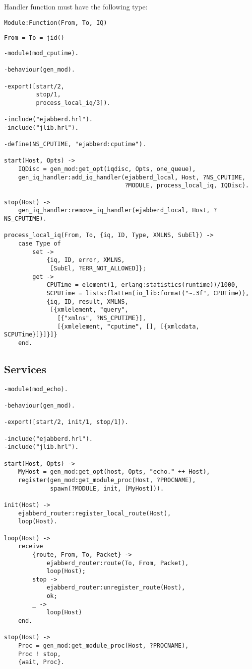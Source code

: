 \documentclass[a4paper,10pt]{article}
\begin{document}
Handler function must have the following type:
\begin{description}
\item{\verb|Module:Function(From, To, IQ)|}
\begin{verbatim}
From = To = jid()
\end{verbatim}
\end{description}



\begin{verbatim}
-module(mod_cputime).

-behaviour(gen_mod).

-export([start/2,
         stop/1,
         process_local_iq/3]).

-include("ejabberd.hrl").
-include("jlib.hrl").

-define(NS_CPUTIME, "ejabberd:cputime").

start(Host, Opts) ->
    IQDisc = gen_mod:get_opt(iqdisc, Opts, one_queue),
    gen_iq_handler:add_iq_handler(ejabberd_local, Host, ?NS_CPUTIME,
                                  ?MODULE, process_local_iq, IQDisc).

stop(Host) ->
    gen_iq_handler:remove_iq_handler(ejabberd_local, Host, ?NS_CPUTIME).

process_local_iq(From, To, {iq, ID, Type, XMLNS, SubEl}) ->
    case Type of
        set ->
            {iq, ID, error, XMLNS,
             [SubEl, ?ERR_NOT_ALLOWED]};
        get ->
            CPUTime = element(1, erlang:statistics(runtime))/1000,
            SCPUTime = lists:flatten(io_lib:format("~.3f", CPUTime)),
            {iq, ID, result, XMLNS,
             [{xmlelement, "query",
               [{"xmlns", ?NS_CPUTIME}],
               [{xmlelement, "cputime", [], [{xmlcdata, SCPUTime}]}]}]}
    end.
\end{verbatim}


\subsection{Services}
\label{sec:services}



\begin{verbatim}
-module(mod_echo).

-behaviour(gen_mod).

-export([start/2, init/1, stop/1]).

-include("ejabberd.hrl").
-include("jlib.hrl").

start(Host, Opts) ->
    MyHost = gen_mod:get_opt(host, Opts, "echo." ++ Host),
    register(gen_mod:get_module_proc(Host, ?PROCNAME),
             spawn(?MODULE, init, [MyHost])).

init(Host) ->
    ejabberd_router:register_local_route(Host),
    loop(Host).

loop(Host) ->
    receive
        {route, From, To, Packet} ->
            ejabberd_router:route(To, From, Packet),
            loop(Host);
        stop ->
            ejabberd_router:unregister_route(Host),
            ok;
        _ ->
            loop(Host)
    end.

stop(Host) ->
    Proc = gen_mod:get_module_proc(Host, ?PROCNAME),
    Proc ! stop,
    {wait, Proc}.
\end{verbatim}
\end{document}
